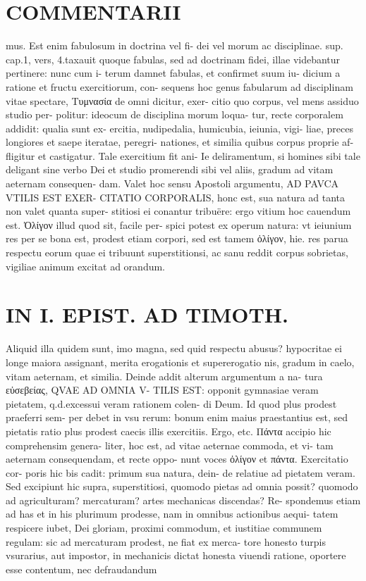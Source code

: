 \documentclass{article}
\begin{document}
\begin{pages}
\section*{COMMENTARII }
\marginpar{[ p.98 ]}\pstart mus. Est enim fabulosum in doctrina vel fi- dei vel morum ac disciplinae. sup. cap.1, vers, 4.taxauit quoque fabulas, sed ad doctrinam fidei, illae videbantur pertinere: nunc cum i- terum damnet fabulas, et confirmet suum iu- dicium a ratione et fructu exercitiorum, con- sequens hoc genus fabularum ad disciplinam vitae spectare, Τυμνασία de omni dicitur, exer- citio quo corpus, vel mens assiduo studio per- politur: ideocum de disciplina morum loqua- tur, recte corporalem addidit: qualia sunt ex- ercitia, nudipedalia, humicubia, ieiunia, vigi- liae, preces longiores et saepe iteratae, peregri- nationes, et similia quibus corpus proprie af- fligitur et castigatur. Tale exercitium fit ani- Ie deliramentum, si homines sibi tale deligant sine verbo Dei et studio promerendi sibi vel aliis, gradum ad vitam aeternam consequen- dam. Valet hoc sensu Apostoli argumentu, AD PAVCA VTILIS EST EXER- CITATIO CORPORALIS, honc est, sua natura ad tanta non valet quanta super- stitiosi ei conantur tribuëre: ergo vitium hoc cauendum est. Ὀλίγον illud quod sit, facile per- spici potest ex operum natura: vt ieiunium res per se bona est, prodest etiam corpori, sed est tamem ὀλίγον, hie. res parua respectu eorum quae ei tribuunt superstitionsi, ac sanu reddit corpus sobrietas, vigiliae animum excitat ad orandum.  \pend
\section*{IN I. EPIST. AD TIMOTH. }
\marginpar{[ p.99 ]}\pstart Aliquid illa quidem sunt, imo magna, sed quid respectu abusus? hypocritae ei longe maiora assignant, merita erogationis et supererogatio nis, gradum in caelo, vitam aeternam, et similia.  \pend\pstart Deinde addit alterum argumentum a na- tura εὐσεβείας, QVAE AD OMNIA V- TILIS EST: opponit gymnasiae veram pietatem, q.d.excessui veram rationem colen- di Deum. Id quod plus prodest praeferri sem- per debet in vsu rerum: bonum enim maius praestantius est, sed pietatis ratio plus prodest caecis illis exercitiis. Ergo, etc.  \pend\pstart Πάντα accipio hic comprehensim genera- liter, hoc est, ad vitae aeternae commoda, et vi- tam aeternam consequendam, et recte oppo- nunt voces ὀλίγον et πάντα. Exercitatio cor- poris hic bis cadit: primum sua natura, dein- de relatiue ad pietatem veram. Sed excipiunt hic supra, superstitiosi, quomodo pietas ad omnia possit? quomodo ad agriculturam? mercaturam? artes mechanicas discendas? Re- spondemus etiam ad has et in his plurimum prodesse, nam in omnibus actionibus aequi- tatem respicere iubet, Dei gloriam, proximi commodum, et iustitiae communem regulam: sic ad mercaturam prodest, ne fiat ex merca- tore honesto turpis vsurarius, aut impostor, in mechanicis dictat honesta viuendi ratione, oportere esse contentum, nec defraudandum  \pend

\end{pages}
\end{document}
